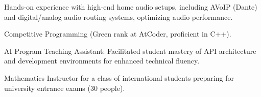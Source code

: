 

\begin{cvparagraph}

\begin{cvbullets}
    \item Hands‑on experience with high‑end home audio setups, including AVoIP (Dante) and digital/analog audio routing systems, optimizing audio performance.
    \item Competitive Programming (Green rank at AtCoder, proficient in C++).
    \item AI Program Teaching Assistant: Facilitated student mastery of API architecture and development environments for enhanced technical fluency.
    \item Mathematics Instructor for a class of international students preparing for university entrance exams (30 people).
\end{cvbullets}
\end{cvparagraph}
